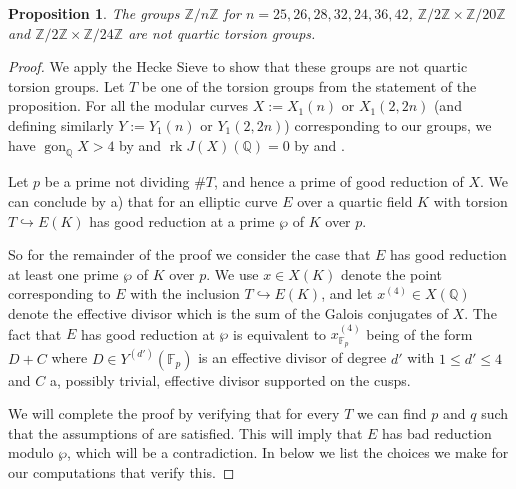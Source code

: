 \documentclass[11pt,reqno]{amsart}
\DeclareMathOperator{\rk}{rk}
\DeclareMathOperator{\gon}{gon}
\newtheorem{proposition}[theorem]{Proposition}
\theoremstyle{definition}
\numberwithin{equation}{section}
\newcommand{\Q}{\mathbb{Q}}
\newcommand{\F}{\mathbb{F}}
\def\torz#1{\mathbb Z /#1 \mathbb Z}
\def\tg#1#2{\mathbb Z/#1\mathbb Z \times \mathbb Z /#2 \mathbb Z}
\begin{document}
\begin{proposition}\label{cor:2_2n}
    The groups $\torz{n}$ for $n=25,26,28,32,24,36,42$, $\tg{2}{20}$ and $\tg{2}{24}$ are not quartic torsion groups.
\end{proposition}
\begin{proof}

We apply the Hecke Sieve to show that these groups are not quartic torsion groups. Let $T$ be one of the torsion groups from the statement of the proposition. For all the modular curves $X:=X_1(n)$ or $X_1(2,2n)$ (and defining similarly $Y:=Y_1(n)$ or $Y_1(2,2n)$) corresponding to our groups, we have $\gon_\Q X>4$ by \cite[Theorem 2.6 and Proposition 2.7]{JeonKimPark06} and $\rk J(X)(\Q)=0$ by \cite[Theorem 4.1]{DerickxSutherland} and \cite[Theorem 3.1]{Deg3Class}.

Let $p$ be a prime not dividing $\#T$, and hence a prime of good reduction of $X$. We can conclude by  a) that for an elliptic curve $E$ over a quartic field $K$ with torsion $T \hookrightarrow E(K)$ has good reduction at a prime $\wp$ of $K$ over $p$.

So for the remainder of the proof we consider the case that $E$ has good reduction at least one prime $\wp$ of $K$ over $p$. We use $x \in X(K)$ denote the point corresponding to $E$ with the inclusion $T \hookrightarrow E(K)$, and let $x^{(4)} \in X(\Q)$ denote the effective divisor which is the sum of the Galois conjugates of $X$. The fact that $E$ has good reduction at $\wp$ is equivalent to $x^{(4)}_{\F_p}$ being of the form $D+C$ where $D \in Y^{(d')}(\F_p)$ is an effective divisor of degree $d'$ with $1 \leq d' \leq 4$ and $C$ a, possibly trivial, effective divisor supported on the cusps. 

We will complete the proof by verifying that for every $T$ we can find $p$ and $q$ such that the assumptions of  are satisfied. This will imply that $E$ has bad reduction modulo $\wp$, which will be a contradiction. In  below we list the choices we make for our computations that verify this. 


\end{proof}
\end{document}
